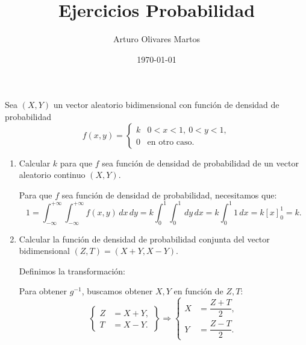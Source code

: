 \documentclass[12pt]{article}
\title{Ejercicios Probabilidad}
\date{\today}
\author{Arturo Olivares Martos}
\begin{document}
    \maketitle

    \begin{ejercicio}
        Sea $(X,Y)$ un vector aleatorio bidimensional con función de densidad de probabilidad
        \begin{equation*}
            f(x, y) = \begin{cases}
                k & 0<x<1,~0<y<1, \\
                0 & \text{en otro caso}.
            \end{cases}
        \end{equation*}
        \begin{enumerate}
            \item Calcular $k$ para que $f$ sea función de densidad de probabilidad de un vector aleatorio continuo $(X,Y)$.
            
            Para que $f$ sea función de densidad de probabilidad, necesitamos que:
            \begin{equation*}
                1=\int_{-\infty}^{+\infty} \int_{-\infty}^{+\infty} f(x, y) \, dx \, dy = k\int_{0}^{1} \int_{0}^{1} \, dy \, dx = k\int_{0}^{1} 1 \, dx = k\left[x\right]_0^1 = k.
            \end{equation*}
            \item Calcular la función de densidad de probabilidad conjunta del vector bidimensional $(Z,T)=(X+Y,X-Y)$.
            
            Definimos la transformación:
    
            Para obtener $g^{-1}$, buscamos obtener $X,Y$ en función de $Z,T$:
            \begin{equation*}
                \left\{\begin{aligned}
                    Z&=X+Y, \\
                    T&=X-Y.
                \end{aligned}\right\}\Longrightarrow
                \left\{\begin{aligned}
                    X&=\dfrac{Z+T}{2}, \\
                    Y&=\dfrac{Z-T}{2}.
                \end{aligned}\right.
            \end{equation*}
    

\end{enumerate}
\end{ejercicio}
\end{document}
